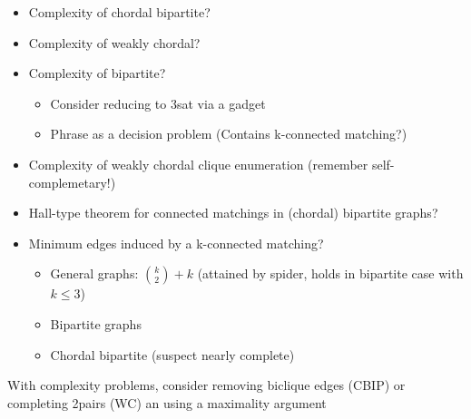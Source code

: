 \documentclass[12pt]{article}
\begin{document}
\begin{itemize}

	\item Complexity of chordal bipartite?
	\item Complexity of weakly chordal?
	\item Complexity of bipartite?
	\begin{itemize}
		\item Consider reducing to 3sat via a gadget
		\item Phrase as a decision problem (Contains k-connected matching?)
	\end{itemize}
	\item Complexity of weakly chordal clique enumeration (remember self-complemetary!)
	\item Hall-type theorem for connected matchings in (chordal) bipartite graphs?
	\item Minimum edges induced by a k-connected matching?
	\begin{itemize}
		\item General graphs: ${k\choose 2} + k$ (attained by spider, holds in bipartite case with $k \leq 3$)
		\item Bipartite graphs
		\item Chordal bipartite (suspect nearly complete)

	\end{itemize}
	 
	 
\end{itemize}

With complexity problems, consider removing biclique edges (CBIP) or completing 2pairs (WC) an using a maximality argument
\end{document}
